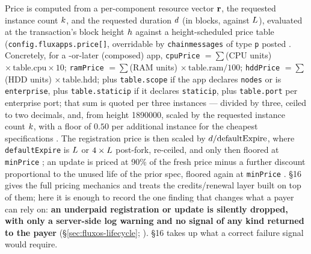 Price is computed from a per-component resource vector $\mathbf{r}$, the requested instance count
$k$, and the requested duration $d$ (in blocks, against $L$), evaluated at the
transaction's block height $h$ against a height-scheduled price table
(\texttt{config.\allowbreak{}fluxapps.\allowbreak{}price[]}, overridable by \texttt{chainmessages} of type \texttt{p} posted
 .
Concretely, for a -or-later (composed) app, \texttt{cpuPrice} $= \sum$(CPU units)
$\times\,\text{table.cpu}\times 10$; \texttt{ramPrice} $=\sum$(RAM units)
$\times\,\text{table.ram}/100$; \texttt{hddPrice} $=\sum$(HDD units) $\times\,\text{table.hdd}$;
plus \texttt{table.scope} if the app declares \texttt{nodes} or is \texttt{enterprise}, plus
\texttt{table.staticip} if it declares \texttt{staticip}, plus \texttt{table.port} per enterprise
port; that sum is quoted per three instances --- divided by three, ceiled to two decimals, and, from
height \num{1890000}, scaled by the requested instance count $k$, with a floor of $0.50$ per
additional instance for the cheapest specifications
. The registration price is then
scaled by $d/\text{defaultExpire}$, where \texttt{defaultExpire} is $L$ or
$4\times L$ post-\PoN fork, re-ceiled, and only then floored at \texttt{minPrice}
; an update is priced
at 90\% of the fresh price minus a further discount proportional to the unused life of the prior
spec, floored again at \texttt{minPrice} .
\S16 gives the full pricing mechanics and treats the credits/renewal layer built on top of them;
here it is enough to record the one finding that changes what a payer can rely on:
\textbf{an underpaid registration or update is silently dropped, with only a server-side log
warning and no signal of any kind returned to the payer}
(\S\ref{sec:fluxos-lifecycle}; ).
\S16 takes up what a correct failure signal would require.

